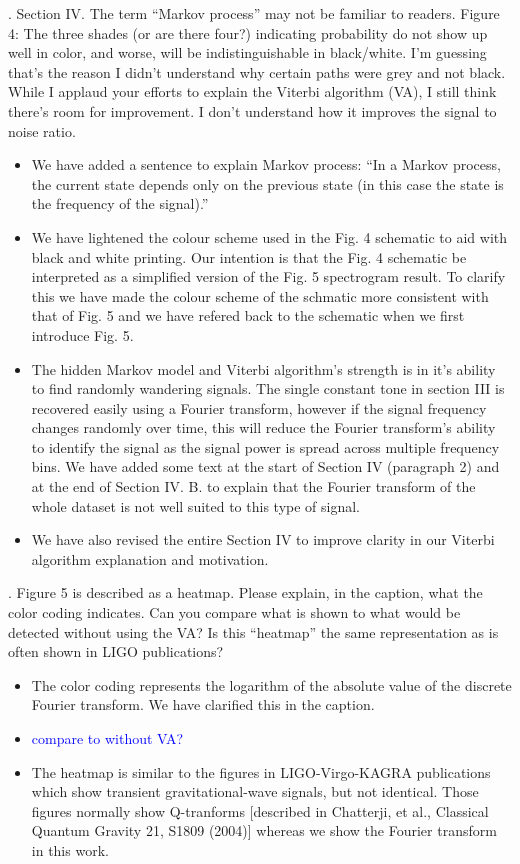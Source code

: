 \documentclass{article}
\newcommand{\todo}{\textcolor{blue}}
\begin{document}
. Section IV.  The term “Markov process” may not be familiar to readers.  Figure 4: The three shades (or are there four?) indicating probability do not show up well in color, and worse, will be indistinguishable in black/white.  I’m guessing that’s the reason I didn’t understand why certain paths were grey and not black.  While I applaud your efforts to explain the Viterbi algorithm (VA), I still think there’s room for improvement.  I don’t understand how it improves the signal to noise ratio. 
\begin{itemize}
\item We have added a sentence to explain Markov process: ``In a Markov process, the current state depends only on the previous state (in this case the state is the frequency of the signal).''
\item We have lightened the colour scheme used in the Fig. 4 schematic to aid with black and white printing. Our intention is that the Fig. 4 schematic be interpreted as a simplified version of the Fig. 5 spectrogram result. To clarify this we have made the colour scheme of the schmatic more consistent with that of Fig. 5 and we have refered back to the schematic when we first introduce Fig. 5. 
\item The hidden Markov model and Viterbi algorithm's strength is in it's ability to find randomly wandering signals. The single constant tone in section III is recovered easily using a Fourier transform, however if the signal frequency changes randomly over time, this will reduce the Fourier transform's ability to identify the signal as the signal power is spread across multiple frequency bins. We have added some text at the start of Section IV (paragraph 2) and at the end of Section IV. B. to explain that the Fourier transform of the whole dataset is not well suited to this type of signal.
\item We have also revised the entire Section IV to improve clarity in our Viterbi algorithm explanation and motivation.
\end{itemize}


. Figure 5 is described as a heatmap.  Please explain, in the caption, what the color coding indicates.  Can you compare what is shown to what would be detected without using the VA?  Is this “heatmap” the same representation as is often shown in LIGO publications?
\begin{itemize}
\item The color coding represents the logarithm of the absolute value of the discrete Fourier transform. We have clarified this in the caption.
\item \todo{compare to without VA?}
\item The heatmap is similar to the figures in LIGO-Virgo-KAGRA publications which show transient gravitational-wave signals, but not identical. Those figures normally show Q-tranforms [described in Chatterji, et al., Classical Quantum Gravity 21, S1809 (2004)] whereas we show the Fourier transform in this work. 
\end{itemize}
\end{document}
